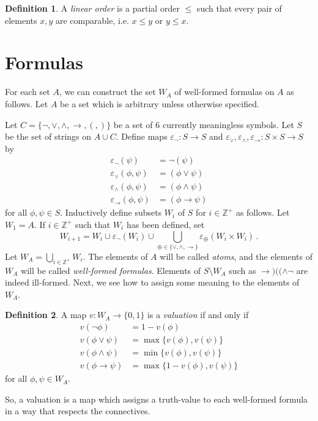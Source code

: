 \documentclass[12pt]{article}
\theoremstyle{definition}
\newtheorem*{definition}{\color{OliveGreen} Definition}
\begin{document}
\begin{multicols*}{2}
\begin{definition}
	A \emph{linear order} is a partial order $\leq$ such that every pair of elements $x,y$ are comparable, i.e. $x\leq y$ or $y\leq x$.
\end{definition}

\section*{Formulas}

For each set $A$, we can construct the set $W_A$ of well-formed formulas on $A$ as follows. Let $A$ be a set which is arbitrary unless otherwise specified.

Let $C=\{\neg,\lor,\land,\rightarrow,(,)\}$ be a set of $6$ currently meaningless symbols. Let $S$ be the set of strings on $A\cup C$. Define maps $\varepsilon_\neg: S\rightarrow S$ and $\varepsilon_\lor,\varepsilon_\land,\varepsilon_\rightarrow: S\times S\rightarrow S$ by
\begin{align*}
	\varepsilon_\neg(\psi) &= \neg(\psi) \\
	\varepsilon_\lor(\phi,\psi) &= (\phi\lor\psi) \\
	\varepsilon_\land(\phi,\psi) &= (\phi\land\psi) \\
	\varepsilon_\rightarrow(\phi,\psi) &= (\phi\rightarrow\psi)
\end{align*}
for all $\phi,\psi\in S$. Inductively define subsets $W_i$ of $S$ for $i\in\mathbb{Z}^+$ as follows. Let $W_1 = A$. If $i\in\mathbb{Z}^+$ such that $W_i$ has been defined, set
\[
	W_{i+1} = W_i\cup \varepsilon_\neg(W_i)\cup\bigcup_{\oplus\in\{\lor,\land,\rightarrow\}}\varepsilon_\oplus(W_i\times W_i)\,.
\]
Let $W_A = \bigcup_{i\in\mathbb{Z}^+} W_i$. The elements of $A$ will be called \emph{atoms}, and the elements of $W_A$ will be called \emph{well-formed formulas}. Elements of $S\setminus W_A$ such as $\rightarrow)((\land\neg$ are indeed ill-formed. Next, we see how to assign some meaning to the elements of $W_A$.

\begin{definition}
	A map $v: W_A\rightarrow \{0,1\}$ is a \emph{valuation} if and only if
	\begin{align*}
		v(\neg\phi) &= 1 - v(\phi) \\
		v(\phi\lor\psi) &= \max\{v(\phi),v(\psi)\} \\
		v(\phi\land\psi) &= \min\{v(\phi),v(\psi)\} \\
		v(\phi\rightarrow\psi) &= \max\{1-v(\phi),v(\psi)\}
	\end{align*}
	for all $\phi,\psi\in W_A$.
\end{definition}
So, a valuation is a map which assigns a truth-value to each well-formed formula in a way that respects the connectives.


\end{multicols*}
\end{document}
